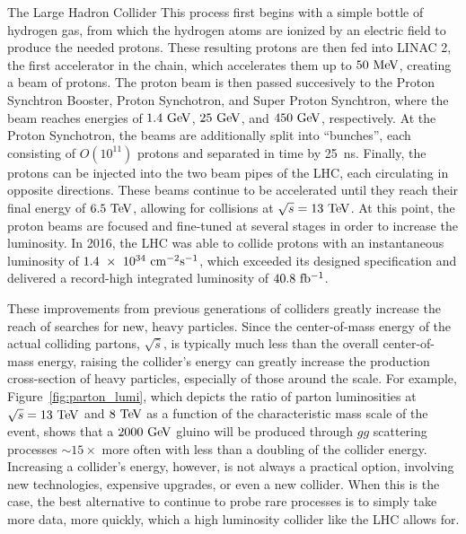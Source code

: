 \begin{section}{The Large Hadron Collider}
This process first begins with a simple bottle of hydrogen gas, from which the hydrogen atoms are ionized by an electric field to produce the needed protons.
These resulting protons are then fed into LINAC 2, the first accelerator in the chain, which accelerates them up to $50~\mathrm{Me\kern -0.1em V}$, creating a beam of protons.
The proton beam is then passed succesively to the Proton Synchtron Booster, Proton Synchotron, and Super Proton Synchtron, where the beam reaches energies of $1.4~\mathrm{Ge\kern -0.1em V}$, $25~\mathrm{Ge\kern -0.1em V}$, and $450~\mathrm{Ge\kern -0.1em V}$, respectively.
At the Proton Synchotron, the beams are additionally split into ``bunches'', each consisting of $O(10^{11})$ protons and separated in time by 25~ns. 
Finally, the protons can be injected into the two beam pipes of the LHC, each circulating in opposite directions. 
These beams continue to be accelerated until they reach their final energy of $6.5~\mathrm{Te\kern -0.1em V}$, allowing for collisions at $\sqrt{s} = 13~\mathrm{Te\kern -0.1em V}$.
At this point, the proton beams are focused and fine-tuned at several stages in order to increase the luminosity. 
In 2016, the LHC was able to collide protons with an instantaneous luminosity of $1.4~\times~10^{34}~\mathrm{cm}^{-2}\mathrm{s}^{-1}$, which exceeded its designed specification and delivered a record-high integrated luminosity of $40.8~\mathrm{fb^{-1}}$.

These improvements from previous generations of colliders greatly increase the reach of searches for new, heavy particles.
Since the center-of-mass energy of the actual colliding partons, $\sqrt{\hat{s}}$, is typically much less than the overall center-of-mass energy, raising the collider's energy can greatly increase the production cross-section of heavy particles, especially of those around the \TeV scale. 
For example, Figure~\ref{fig:parton_lumi}, which depicts the ratio of parton luminosities at $\sqrt{s} = 13~\mathrm{Te\kern -0.1em V}$ and $8~\mathrm{Te\kern -0.1em V}$ as a function of the characteristic mass scale of the event, shows that a $2000~\mathrm{Ge\kern -0.1em V}$ gluino will be produced through $gg$ scattering processes ${\sim}15\times$ more often with less than a doubling of the collider energy.
Increasing a collider's energy, however, is not always a practical option, involving new technologies, expensive upgrades, or even a new collider. When this is the case, the best alternative to continue to probe rare processes is to simply take more data, more quickly, which a high luminosity collider like the LHC allows for.


\end{section}
